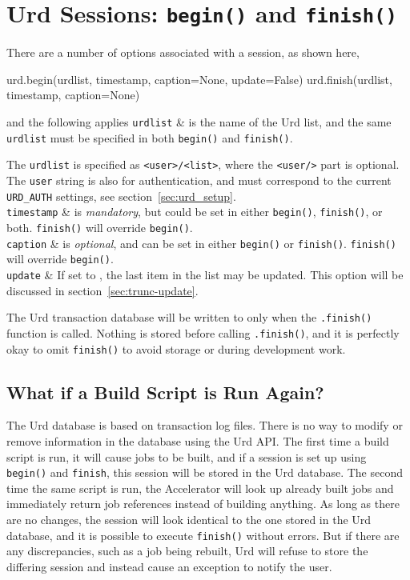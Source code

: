 \section{Urd Sessions:  \texttt{begin()} and \texttt{finish()}}

There are a number of options associated with a session, as shown
here,
\begin{python}
urd.begin(urdlist, timestamp, caption=None, update=False)
urd.finish(urdlist, timestamp, caption=None)
\end{python}
and the following applies
\starttabletwo
\RPtwo \texttt{urdlist} & is the name of the Urd list, and the same
  \texttt{urdlist} must be specified in both \texttt{begin()}
  and \texttt{finish()}.

  The \texttt{urdlist} is specified as \texttt{<user>/<list>}, where
  the \texttt{<user/>} part is optional.  The \texttt{user} string
  is also for authentication, and must correspond to the
  current \texttt{URD\_AUTH} settings, see section~\ref{sec:urd_setup}.\\[2ex]

\RPtwo \texttt{timestamp} & is \textsl{mandatory}, but could be set in either
  \texttt{begin()}, \texttt{finish()}, or both.  \texttt{finish()}
  will override \texttt{begin()}.\\[2ex]

\RPtwo \texttt{caption} & is \textsl{optional}, and can be set in either
  \texttt{begin()} or \texttt{finish()}.  \texttt{finish()}
  will override \texttt{begin()}.\\[2ex]

\RPtwo \texttt{update} &  If set to \pyTrue, the last item in the list may be updated.
  This option will be discussed in section~\ref{sec:trunc-update}.\\[2ex]
\stoptabletwo

The Urd transaction database will be written to only when
the \texttt{.finish()} function is called.  Nothing is stored before
calling \texttt{.finish()}, and it is perfectly okay to
omit \texttt{finish()} to avoid storage or during development work.



\subsection{What if a Build Script is Run Again?}
The Urd database is based on transaction log files.  There is no way
to modify or remove information in the database using the Urd API.
The first time a build script is run, it will cause jobs to be built,
and if a session is set up using \texttt{begin()} and \texttt{finish},
this session will be stored in the Urd database.  The second time the
same script is run, the Accelerator will look up already built jobs
and immediately return job references instead of building anything.
As long as there are no changes, the session will look identical to
the one stored in the Urd database, and it is possible to
execute \texttt{finish()} without errors.  But if there are any
discrepancies, such as a job being rebuilt, Urd will refuse to store
the differing session and instead cause an exception to notify the
user.

